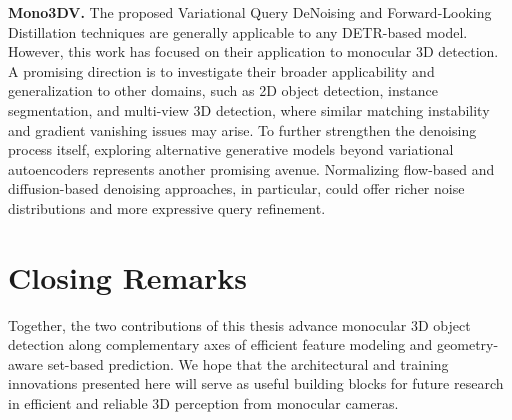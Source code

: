 \textbf{Mono3DV.} The proposed Variational Query DeNoising and Forward-Looking Distillation techniques are generally applicable to any DETR-based model. However, this work has focused on their application to monocular 3D detection. A promising direction is to investigate their broader applicability and generalization to other domains, such as 2D object detection, instance segmentation, and multi-view 3D detection, where similar matching instability and gradient vanishing issues may arise. To further strengthen the denoising process itself, exploring alternative generative models beyond variational autoencoders represents another promising avenue. Normalizing flow-based and diffusion-based denoising approaches, in particular, could offer richer noise distributions and more expressive query refinement.

\section*{Closing Remarks}

Together, the two contributions of this thesis advance monocular 3D object detection along complementary axes of efficient feature modeling and geometry-aware set-based prediction. We hope that the architectural and training innovations presented here will serve as useful building blocks for future research in efficient and reliable 3D perception from monocular cameras.
